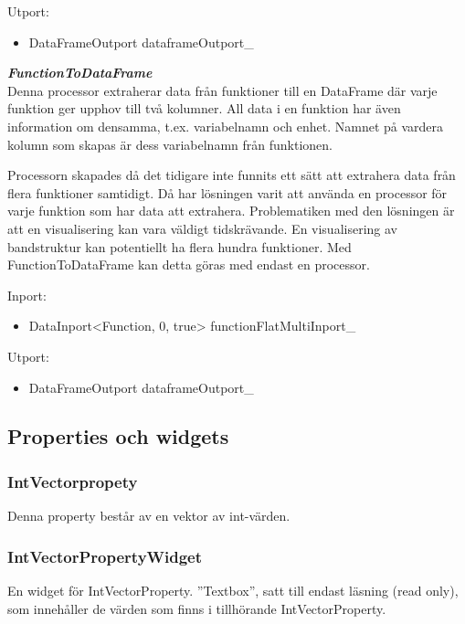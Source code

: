 Utport:
\begin{itemize}
    \item DataFrameOutport dataframeOutport\_
\end{itemize}

\textit{\textbf{FunctionToDataFrame}}\\
Denna processor extraherar data från funktioner till en DataFrame där varje funktion ger upphov till två kolumner. All data i en funktion har även information om densamma, t.ex. variabelnamn och enhet. Namnet på vardera kolumn som skapas är dess variabelnamn från funktionen. 

Processorn skapades då det tidigare inte funnits ett sätt att extrahera data från flera funktioner samtidigt. Då har lösningen varit att använda en processor för varje funktion som har data att extrahera. Problematiken med den lösningen är att en visualisering kan vara väldigt tidskrävande. En visualisering av bandstruktur kan potentiellt ha flera hundra funktioner. Med FunctionToDataFrame kan detta göras med endast en processor.

Inport:
\begin{itemize}
    \item DataInport<Function, 0, true> functionFlatMultiInport\_
\end{itemize}

Utport:
\begin{itemize}
    \item DataFrameOutport dataframeOutport\_
\end{itemize}

\subsection{Properties och widgets}
\label{ssec:Properties}
\subsubsection{IntVectorpropety}
Denna property består av en vektor av int-värden.
\subsubsection{IntVectorPropertyWidget}
En widget för IntVectorProperty. ''Textbox'', satt till endast läsning (read only), som innehåller de värden som finns i tillhörande IntVectorProperty.